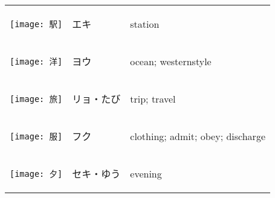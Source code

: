 \documentclass[a4paper,12pt]{extarticle}
\begin{document}
\begin{longtable}{|lp{6cm}p{4cm}|}
\\ 
\begin{minipage}{0.3\textwidth}
\centerline{
	\texttt{[image: 駅]}
}
\end{minipage}
&
\begin{CJK}{UTF8}{min}エキ\end{CJK}
&
station
\\ 
\begin{minipage}{0.3\textwidth}
\centerline{
	\texttt{[image: 洋]}
}
\end{minipage}
&
\begin{CJK}{UTF8}{min}ヨウ\end{CJK}
&
ocean; westernstyle
\\ 
\begin{minipage}{0.3\textwidth}
\centerline{
	\texttt{[image: 旅]}
}
\end{minipage}
&
\begin{CJK}{UTF8}{min}リョ・たび\end{CJK}
&
trip; travel
\\ 
\begin{minipage}{0.3\textwidth}
\centerline{
	\texttt{[image: 服]}
}
\end{minipage}
&
\begin{CJK}{UTF8}{min}フク\end{CJK}
&
clothing; admit; obey; discharge
\\ 
\begin{minipage}{0.3\textwidth}
\centerline{
	\texttt{[image: 夕]}
}
\end{minipage}
&
\begin{CJK}{UTF8}{min}セキ・ゆう\end{CJK}
&
evening
\\ 

\end{longtable}
\end{document}
